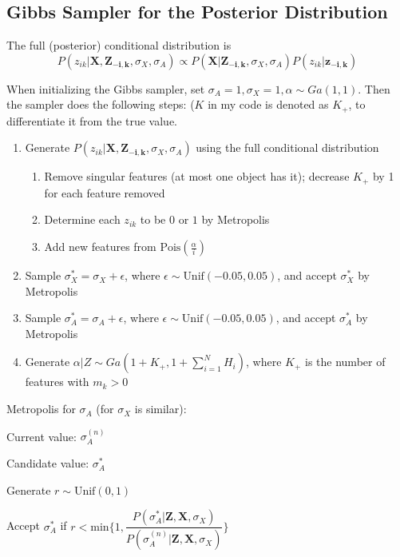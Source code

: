 \subsection{Gibbs Sampler for the Posterior Distribution}

The full (posterior) conditional distribution is
\begin{equation}
P(z_{ik} | \mathbf{X,Z_{-i,k}},\sigma_X, \sigma_A) \propto P(\mathbf{X} | \mathbf{Z_{-i,k}},\sigma_X, \sigma_A) P(z_{ik} | \mathbf{z_{-i,k}})
\end{equation}

When initializing the Gibbs sampler, set $\sigma_A = 1, \sigma_X = 1, \alpha \sim Ga(1,1)$. Then the sampler does the following steps: ($K$ in my code is denoted as $K_+$, to differentiate it from the true value.

\begin{enumerate}
\item Generate $P(z_{ik} | \mathbf{X,Z_{-i,k}},\sigma_X, \sigma_A)$ using the full conditional distribution
    \begin{enumerate}
    \item Remove singular features (at most one object has it); decrease $K_+$ by 1 for each feature removed
    \item Determine each $z_{ik}$ to be $0$ or $1$ by Metropolis
    \item Add new features from $\text{Pois}(\frac{\alpha}{i})$
    \end{enumerate}
\item Sample $\sigma_{X}^* = \sigma_X + \epsilon$, where $\epsilon \sim \text{Unif}(-0.05,0.05)$, and accept $\sigma_{X}^*$ by Metropolis 
\item Sample $\sigma_{A}^* = \sigma_A + \epsilon$, where $\epsilon \sim \text{Unif}(-0.05,0.05)$, and accept $\sigma_{A}^*$ by Metropolis 
\item Generate $\alpha|Z \sim Ga(1+K_+,1+\sum^{N}_{i=1}H_i)$, where $K_+$ is the number of features with $m_k > 0$
\end{enumerate}



Metropolis for $\sigma_A$ (for $\sigma_X$ is similar):

Current value: $\sigma_{A}^{(n)}$

Candidate value: $\sigma_{A}^{*}$

Generate $r \sim \text{Unif}(0,1)$

Accept $\sigma_{A}^{*}$ if $r < \text{min}\{ 1, \dfrac{P(\sigma_{A}^{*} | \mathbf{Z,X},\sigma_X)}{P(\sigma_{A}^{(n)} | \mathbf{Z,X},\sigma_X)} \}$




